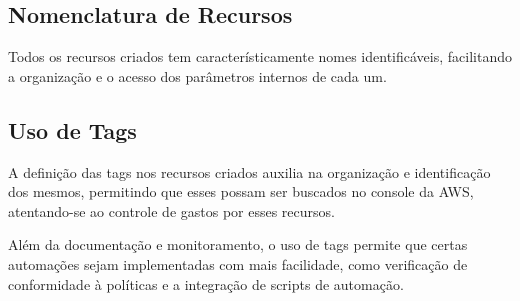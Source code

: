 \documentclass{article}
\begin{document}
\subsection{Nomenclatura de Recursos}
Todos os recursos criados tem característicamente nomes identificáveis, facilitando a organização e o acesso dos parâmetros internos de cada um.

\subsection{Uso de Tags}
A definição das tags nos recursos criados auxilia na organização e identificação dos mesmos, permitindo que esses possam ser buscados no console da AWS, atentando-se ao controle de gastos por esses recursos.

Além da documentação e monitoramento, o uso de tags permite que certas automações sejam implementadas com mais facilidade, como verificação de conformidade à políticas e a integração de scripts de automação.
\end{document}
